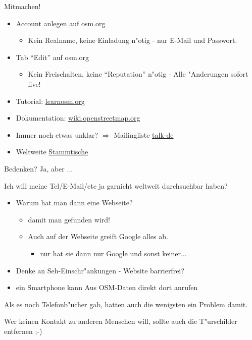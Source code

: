 \documentclass{beamer}
\begin{document}
\begin{frame}{Mitmachen!}
\begin{itemize}
  \item Account anlegen auf osm.org
	\begin{itemize}
		\item Kein Realname, keine Einladung n"otig - nur E-Mail und Passwort.
	\end{itemize}
  \item Tab "`Edit"' auf osm.org
	\begin{itemize}
		\item Kein Freischalten, keine "`Reputation"' n"otig - Alle "Anderungen sofort live!
	\end{itemize}
  \item Tutorial:  \href{http://learnosm.org/}{learnosm.org} 
  \item Dokumentation: \href{http://wiki.openstreetmap.org}{wiki.openstreetmap.org}
  \item Immer noch etwas unklar? $\Rightarrow$ Mailingliste \href{http://lists.openstreetmap.org/listinfo/talk-de}{talk-de}
  \item Weltweite \href{http://usergroups.openstreetmap.de/}{Stammtische}
\end{itemize}

\end{frame}

\begin{frame}{Bedenken?}
Ja, aber ...

\vspace{0.3cm}

Ich will meine Tel/E-Mail/etc ja garnicht weltweit durchsuchbar haben?

\pause
\begin{itemize}
	  \item Warum hat man dann eine Webseite?
	  \begin{itemize}
	            \item damit man gefunden wird!
		    \item Auch auf der Webseite greift Google alles ab.
		     \begin{itemize}
                         \item nur hat sie dann nur Google und sonst keiner...
		 \end{itemize}
	\end{itemize}
	\pause
	\item Denke an Seh-Einschr"ankungen - Website barrierfrei?
	\item ein Smartphone kann Aus OSM-Daten direkt dort anrufen
\end{itemize}
Als es noch Telefonb"ucher gab, hatten auch die wenigsten ein Problem damit.

\vspace{0.3cm}

\pause
Wer keinen Kontakt zu anderen Menschen will, sollte auch die T"urschilder entfernen ;-)

\end{frame}
\end{document}
